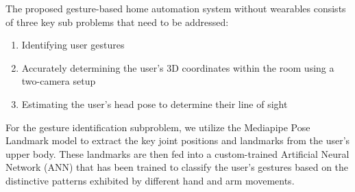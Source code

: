 The proposed gesture-based home automation system without wearables consists of three key sub problems that need to be addressed:

\begin{enumerate}[label=(\alph*)]
	\item Identifying user gestures
	\item Accurately determining the user's 3D coordinates within the room using a two-camera setup
	\item Estimating the user's head pose to determine their line of sight
\end{enumerate}

For the gesture identification subproblem, we utilize the Mediapipe Pose Landmark model to extract the key joint positions and landmarks from the user's upper body. These landmarks are then fed into a custom-trained Artificial Neural Network (ANN) that has been trained to classify the user's gestures based on the distinctive patterns exhibited by different hand and arm movements.

